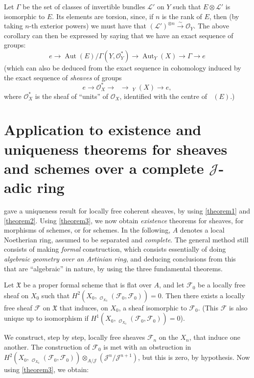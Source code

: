 \documentclass{article}
\theoremstyle{plain}
\newenvironment{proposition}[1]
  {\renewcommand\theinnercustomproposition{#1}\innercustomproposition}
  {\endinnercustomproposition}
\theoremstyle{definition}
\newcommand{\sh}{\mathscr}
\newcommand{\fk}{\mathfrak}
\DeclareMathOperator{\Hom}{Hom}
\DeclareMathOperator{\Aut}{Aut}
\DeclareMathOperator{\shHom}{\underline{\Hom}}
\DeclareMathOperator{\shAut}{\underline{\Aut}}
\newcommand{\oldpage}[1]{\marginpar{\footnotesize$\Big\vert$ \textit{p.~#1}}}
\begin{document}
Let $\Gamma$ be the set of classes of invertible bundles $\sh{L}'$ on $Y$ such that $E\otimes\sh{L}'$ is isomorphic to $E$.
Its elements are torsion, since, if $n$ is the rank of $E$, then (by taking $n$-th exterior powers) we must have that $(\sh{L}')^{\otimes n}\xrightarrow{\sim}\sh{O}_Y$.
The above corollary can then be expressed by saying that we have an exact sequence of groups:
\[
  e \to \Aut(E)/\Gamma(Y,\sh{O}_Y^*) \to \Aut_Y(X) \to \Gamma \to e
\]
(which can also be deduced from the exact sequence in cohomology induced by the exact sequence of \emph{sheaves} of groups
\oldpage{182-11}
\[
  e \to \sh{O}_X^* \to \shAut \to \shAut_Y(X) \to e,
\]
where $\sh{O}_X^*$ is the sheaf of ``units'' of $\sh{O}_X$, identified with the centre of $\shAut(E)$.)


\section{Application to existence and uniqueness theorems for sheaves and schemes over a complete $\mathscr{J}$-adic ring}
\label{section6}

 gave a uniqueness result for locally free coherent sheaves, by using \cref{theorem1} and \cref{theorem2}.
Using \cref{theorem3}, we now obtain \emph{existence} theorems for sheaves, for morphisms of schemes, or for schemes.
In the following, $A$ denotes a local Noetherian ring, assumed to be separated and \emph{complete}.
The general method still consists of making \emph{formal} construction, which consists essentially of doing \emph{algebraic geometry over an Artinian ring}, and deducing conclusions from this that are ``algebraic'' in nature, by using the three fundamental theorems.

\begin{proposition}{3}
\label{proposition3}
  Let $\fk{X}$ be a proper formal scheme that is flat over $A$, and let $\sh{F}_0$ be a locally free sheaf on $X_0$ such that $H^2(X_0,\shHom_{\sh{O}_{X_0}}(\sh{F}_0,\sh{F}_0))=0$.
  Then there exists a locally free sheaf $\sh{F}$ on $\fk{X}$ that induces, on $X_0$, a sheaf isomorphic to $\sh{F}_0$.
  (This $\sh{F}$ is also unique up to isomorphism if $H^1(X_0,\shHom_{\sh{O}_{X_0}}(\sh{F}_0,\sh{F}_0))=0$).
\end{proposition}

We construct, step by step, locally free sheaves $\sh{F}_n$ on the $X_n$, that induce one another.
The construction of $\sh{F}_0$ is met with an obstruction in $H^2(X_0,\shHom_{\sh{O}_{X_0}}(\sh{F}_0,\sh{F}_0))\otimes_{A/\sh{J}}(\sh{J}^n/\sh{J}^{n+1})$, but this is zero, by hypothesis.
Now using \cref{theorem3}, we obtain:
\end{document}

